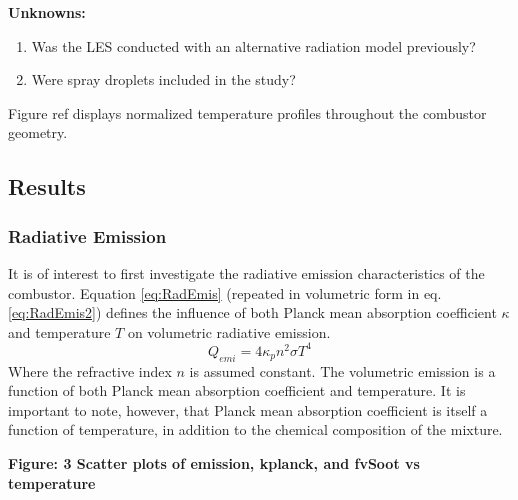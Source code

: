 \textbf{Unknowns:}
\begin{enumerate}
    \item Was the LES conducted with an alternative radiation model previously?
    \item Were spray droplets included in the study?
\end{enumerate}

Figure ref{} displays normalized temperature profiles throughout the combustor geometry.



\subsection{Results}

\subsubsection{Radiative Emission}
It is of interest to first investigate the radiative emission characteristics of the combustor.
Equation \ref{eq:RadEmis} (repeated in volumetric form in eq. \ref{eq:RadEmis2}) defines the influence of both Planck mean absorption coefficient $\kappa{}$ and temperature $T$ on volumetric radiative emission.
\begin{equation}
    Q_{emi}=4\kappa{}_{p}n^2\sigma{}T^4
    \label{eq:RadEmis2}
\end{equation}
Where the refractive index $n$ is assumed constant. 
The volumetric emission is a function of both Planck mean absorption coefficient and temperature. It is important to note, however, that Planck mean absorption coefficient is itself a function of temperature, in addition to the chemical composition of the mixture. 

\textbf{\checkmark Figure: 3 Scatter plots of emission, kplanck, and fvSoot vs temperature}

